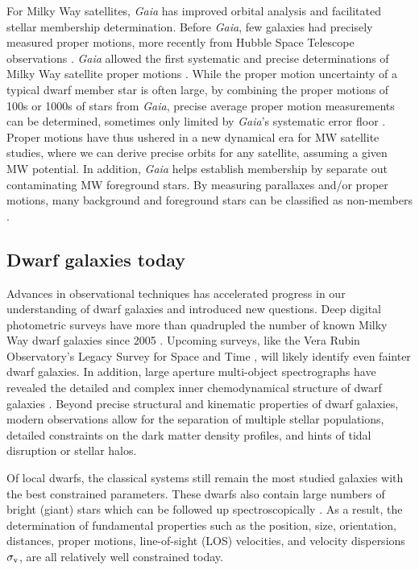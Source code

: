 For Milky Way satellites, \emph{Gaia} has improved orbital analysis and
facilitated stellar membership determination. Before \emph{Gaia}, few
galaxies had precisely measured proper motions, more recently from
Hubble Space Telescope observations \citep[e.g.,][]{sohn+2017}.
\emph{Gaia} allowed the first systematic and precise determinations of
Milky Way satellite proper motions \citep{pace+li2019, MV2020a}. While
the proper motion uncertainty of a typical dwarf member star is often
large, by combining the proper motions of 100s or 1000s of stars from
\emph{Gaia}, precise average proper motion measurements can be
determined, sometimes only limited by \emph{Gaia}'s systematic error
floor \citep[e.g.,][]{MV2020a}. Proper motions have thus ushered in a
new dynamical era for MW satellite studies, where we can derive precise
orbits for any satellite, assuming a given MW potential. In addition,
\emph{Gaia} helps establish membership by separate out contaminating MW
foreground stars. By measuring parallaxes and/or proper motions, many
background and foreground stars can be classified as non-members
\citep[e.g.,][]{battaglia+2022, jensen+2024}.

\subsection{Dwarf galaxies today}\label{dwarf-galaxies-today}

Advances in observational techniques has accelerated progress in our
understanding of dwarf galaxies and introduced new questions. Deep
digital photometric surveys have more than quadrupled the number of
known Milky Way dwarf galaxies since 2005 \citep{simon2019}. Upcoming
surveys, like the Vera Rubin Observatory's Legacy Survey for Space and
Time \citep[LSST,][]{ivezic+2019}, will likely identify even fainter
dwarf galaxies. In addition, large aperture multi-object spectrographs
have revealed the detailed and complex inner chemodynamical structure of
dwarf galaxies \citep[e.g.,][]{battaglia+2006, fabrizio+2016}. Beyond
precise structural and kinematic properties of dwarf galaxies, modern
observations allow for the separation of multiple stellar populations,
detailed constraints on the dark matter density profiles, and hints of
tidal disruption or stellar halos.

Of local dwarfs, the classical systems still remain the most studied
galaxies with the best constrained parameters. These dwarfs also contain
large numbers of bright (giant) stars which can be followed up
spectroscopically \citep[e.g.,][]{tolstoy+2023, pace+2020}. As a result,
the determination of fundamental properties such as the position, size,
orientation, distances, proper motions, line-of-sight (LOS) velocities,
and velocity dispersions \(\sigma_{\rm v}\), are all relatively well
constrained today.

